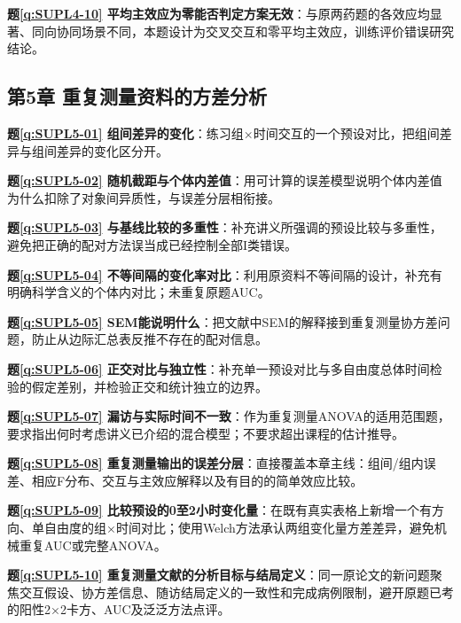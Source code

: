 \noindent\textbf{题\ref*{q:SUPL4-10} 平均主效应为零能否判定方案无效}：与原两药题的各效应均显著、同向协同场景不同，本题设计为交叉交互和零平均主效应，训练评价错误研究结论。\par

\subsection*{第5章 重复测量资料的方差分析}

\noindent\textbf{题\ref*{q:SUPL5-01} 组间差异的变化}：练习组×时间交互的一个预设对比，把组间差异与组间差异的变化区分开。\par

\noindent\textbf{题\ref*{q:SUPL5-02} 随机截距与个体内差值}：用可计算的误差模型说明个体内差值为什么扣除了对象间异质性，与误差分层相衔接。\par

\noindent\textbf{题\ref*{q:SUPL5-03} 与基线比较的多重性}：补充讲义所强调的预设比较与多重性，避免把正确的配对方法误当成已经控制全部I类错误。\par

\noindent\textbf{题\ref*{q:SUPL5-04} 不等间隔的变化率对比}：利用原资料不等间隔的设计，补充有明确科学含义的个体内对比；未重复原题AUC。\par

\noindent\textbf{题\ref*{q:SUPL5-05} SEM能说明什么}：把文献中SEM的解释接到重复测量协方差问题，防止从边际汇总表反推不存在的配对信息。\par

\noindent\textbf{题\ref*{q:SUPL5-06} 正交对比与独立性}：补充单一预设对比与多自由度总体时间检验的假定差别，并检验正交和统计独立的边界。\par

\noindent\textbf{题\ref*{q:SUPL5-07} 漏访与实际时间不一致}：作为重复测量ANOVA的适用范围题，要求指出何时考虑讲义已介绍的混合模型；不要求超出课程的估计推导。\par

\noindent\textbf{题\ref*{q:SUPL5-08} 重复测量输出的误差分层}：直接覆盖本章主线：组间/组内误差、相应F分布、交互与主效应解释以及有目的的简单效应比较。\par

\noindent\textbf{题\ref*{q:SUPL5-09} 比较预设的0至2小时变化量}：在既有真实表格上新增一个有方向、单自由度的组×时间对比；使用Welch方法承认两组变化量方差差异，避免机械重复AUC或完整ANOVA。\par

\noindent\textbf{题\ref*{q:SUPL5-10} 重复测量文献的分析目标与结局定义}：同一原论文的新问题聚焦交互假设、协方差信息、随访结局定义的一致性和完成病例限制，避开原题已考的阳性2×2卡方、AUC及泛泛方法点评。\par

\endgroup
